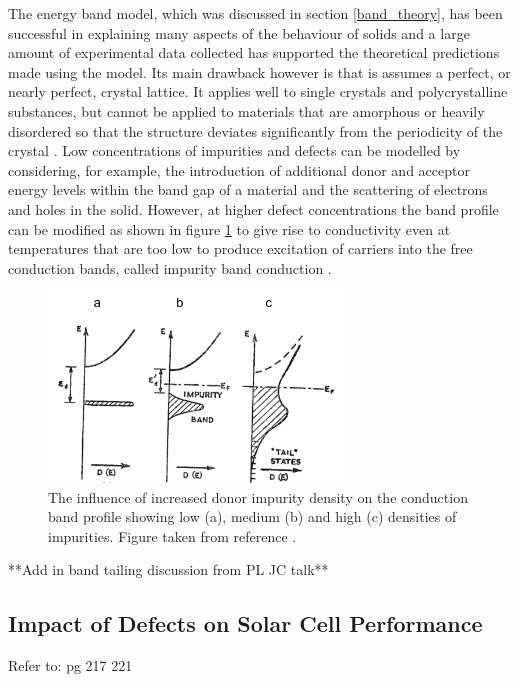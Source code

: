 The energy band model, which was discussed in section \ref{band_theory}, has been successful in explaining many aspects of the behaviour of solids and a large amount of experimental data collected has supported the theoretical predictions made using the model. Its main drawback however is that is assumes a perfect, or nearly perfect, crystal lattice. It applies well to single crystals and polycrystalline substances, but cannot be applied to materials that are amorphous or heavily disordered so that the structure deviates significantly from the periodicity of the crystal \cite{small_semiconductor1}. Low concentrations of impurities and defects can be modelled by considering, for example, the introduction of additional donor and acceptor energy levels within the band gap of a material and the scattering of electrons and holes in the solid. However, at higher defect concentrations the band profile can be modified as shown in figure \ref{bs2} to give rise to conductivity even at temperatures that are too low to produce excitation of carriers into the free conduction bands, called impurity band conduction \cite{small_semiconductor2}.\\

\begin{figure}[h!]
  \centering
    \includegraphics[width=0.7\textwidth]{figures/bs2.png}
    \caption{The influence of increased donor impurity density on the conduction band profile showing low (a), medium (b) and high (c) densities of impurities. Figure taken from reference .}
  \label{bs2}
\end{figure}

**Add in band tailing discussion from PL JC talk**\\





\subsection{Impact of Defects on Solar Cell Performance}\label{defects_in_PV}
Refer to: pg 217 221 \cite{thin_film_Boer}\\

